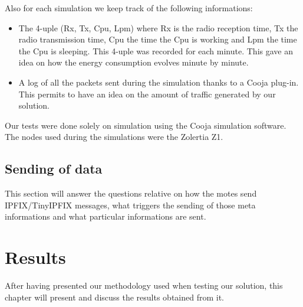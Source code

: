 Also for each simulation we keep track of the following informations:
\begin{itemize}
  \item The 4-uple (Rx, Tx, Cpu, Lpm) where Rx is the radio reception time, Tx the radio transmission time, Cpu the time the Cpu is working and Lpm the time the Cpu is sleeping. This 4-uple was recorded for each minute. This gave an idea on how the energy consumption evolves minute by minute.
  \item A log of all the packets sent during the simulation thanks to a Cooja plug-in. This permits to have an idea on the amount of traffic generated by our solution.\\
\end{itemize}

Our tests were done solely on simulation using the Cooja simulation software. The nodes used during the simulations were the Zolertia Z1.

\section{Sending of data}

This section will answer the questions relative on how the motes send IPFIX/TinyIPFIX messages, what triggers the sending of those meta informations and what particular informations are sent.


\chapter{Results}

After having presented our methodology used when testing our solution, this chapter will present and discuss the results obtained from it.
